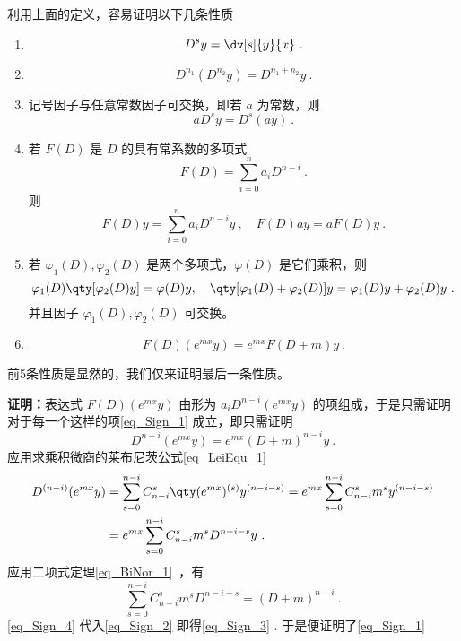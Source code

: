 利用上面的定义，容易证明以下几条性质
\begin{enumerate}
\item 
\begin{equation}
D^sy=\dv[s]{y}{x}~.
\end{equation}
\item 
\begin{equation}
D^{n_1}(D^{n_2}y)=D^{n_1+n_2}y~.
\end{equation}
\item 记号因子与任意常数因子可交换，即若 $a$ 为常数，则
\begin{equation}
aD^sy=D^s(ay)~.
\end{equation}
\item 若 $F(D)$ 是 $D$ 的具有常系数的多项式
\begin{equation}
F(D)=\sum_{i=0}^{n}a_iD^{n-i}~.
\end{equation}
则
\begin{equation}
F(D)y=\sum_{i=0}^{n}a_iD^{n-i}y~,\quad F(D)ay=aF(D)y~.
\end{equation}
\item 若 $\varphi_1(D),\varphi_2(D)$ 是两个多项式，$\varphi(D)$ 是它们乘积，则
\begin{equation}\label{eq_Sign_11}
\varphi_1(D)\qty[\varphi_2(D)y]=\varphi(D)y,\quad \qty[\varphi_1(D)+\varphi_2(D)]y=\varphi_1(D)y+\varphi_2(D)y~.
\end{equation}
并且因子 $\varphi_1(D),\varphi_2(D)$ 可交换。
\item \begin{equation}\label{eq_Sign_1}
F(D)(e^{mx}y)=e^{mx}F(D+m)y~.
\end{equation}
\end{enumerate}

前5条性质是显然的，我们仅来证明最后一条性质。

\textbf{证明：}表达式 $F(D)(e^{mx}y)$ 由形为 $a_{i}D^{n-i}(e^{mx}y)$ 的项组成，于是只需证明对于每一个这样的项\autoref{eq_Sign_1} 成立，即只需证明
\begin{equation}\label{eq_Sign_3}
D^{n-i}(e^{mx}y)=e^{mx}(D+m)^{n-i}y~.
\end{equation}
应用求乘积微商的莱布尼茨公式\autoref{eq_LeiEqu_1}~
\begin{equation}\label{eq_Sign_2}
\begin{aligned}
D^{(n-i)}(e^{mx}y)&=\sum_{s=0}^{n-i}C_{n-i}^s\qty(e^{mx})^{(s)}y^{(n-i-s)}=e^{mx}\sum_{s=0}^{n-i}C_{n-i}^sm^sy^{(n-i-s)}\\
&=e^{mx}\sum_{s=0}^{n-i}C_{n-i}^sm^sD^{n-i-s}y~.
\end{aligned}
\end{equation}
应用二项式定理\autoref{eq_BiNor_1}~，有
\begin{equation}\label{eq_Sign_4}
\sum_{s=0}^{n-i}C_{n-i}^sm^sD^{n-i-s}=(D+m)^{n-i}~.
\end{equation}
\autoref{eq_Sign_4}  代入\autoref{eq_Sign_2} 即得\autoref{eq_Sign_3} . 于是便证明了\autoref{eq_Sign_1} 

